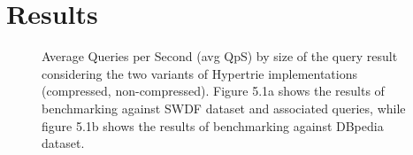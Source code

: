 \section{Results}
\label{sec:results}

\clearpage

\begin{figure}[h]
	\label{fig:benchmarks}
	\centering
	
	
	\caption{Average Queries per Second (avg QpS) by size of the query result considering the two variants of Hypertrie implementations (compressed, non-compressed). Figure 5.1a shows the results of benchmarking against SWDF dataset and associated queries, while figure 5.1b shows  the results of benchmarking against DBpedia dataset.}
\end{figure}
\clearpage